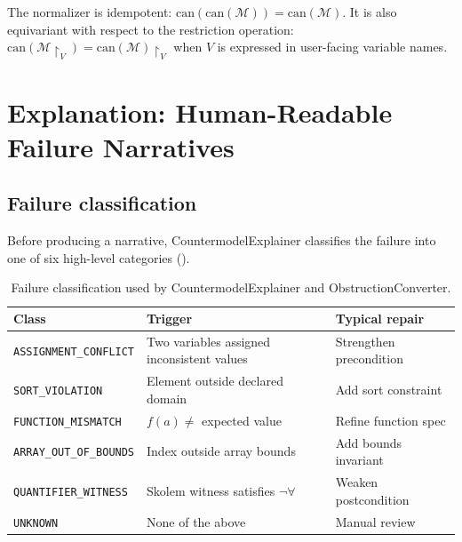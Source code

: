 \documentclass[11pt]{article}
\newcommand{\CMod}{\mathcal{M}}            %
\newcommand{\CanForm}{\mathrm{can}}        %
\begin{document}
\begin{remark}
The normalizer is idempotent: $\CanForm(\CanForm(\CMod)) = \CanForm(\CMod)$.
It is also equivariant with respect to the restriction operation:
$\CanForm(\CMod\restriction_V) = \CanForm(\CMod)\restriction_V$ when
$V$ is expressed in user-facing variable names.
\end{remark}


\section{Explanation: Human-Readable Failure Narratives}
\label{sec:explanation}

\subsection{Failure classification}

Before producing a narrative, \textsf{CountermodelExplainer} classifies
the failure into one of six high-level categories ().

\begin{table}[ht]
\centering
\begin{tabular}{lll}
\toprule
\textbf{Class} & \textbf{Trigger} & \textbf{Typical repair} \\
\midrule
\texttt{ASSIGNMENT\_CONFLICT} & Two variables assigned inconsistent values & Strengthen precondition \\
\texttt{SORT\_VIOLATION}      & Element outside declared domain           & Add sort constraint \\
\texttt{FUNCTION\_MISMATCH}   & $f(a) \neq$ expected value               & Refine function spec \\
\texttt{ARRAY\_OUT\_OF\_BOUNDS} & Index outside array bounds             & Add bounds invariant \\
\texttt{QUANTIFIER\_WITNESS}  & Skolem witness satisfies $\neg\forall$    & Weaken postcondition \\
\texttt{UNKNOWN}              & None of the above                        & Manual review \\
\bottomrule
\end{tabular}
\caption{Failure classification used by \textsf{CountermodelExplainer}
         and \textsf{ObstructionConverter}.}
\label{tab:failclass}
\end{table}
\end{document}
